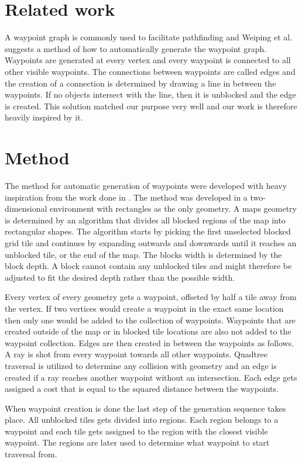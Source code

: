 \documentclass[a4paper]{article}
\begin{document}
\section{Related work}
A waypoint graph is commonly used to facilitate pathfinding and Weiping et al. \cite{dynaPF15} suggests a method of how to automatically generate the waypoint graph. Waypoints are generated at every vertex and every waypoint is connected to all other visible waypoints. The connections between waypoints are called edges \cite{dynaPF15} and the creation of a connection is determined by drawing a line in between the waypoints. If no objects intersect with the line, then it is unblocked and the edge is created. This solution matched our purpose very well and our work is therefore heavily inspired by it.

\section{Method}
The method for automatic generation of waypoints were developed with heavy inspiration from the work done in \cite{dynaPF15}. The method was developed in a two-dimensional environment with rectangles as the only geometry. A maps geometry is determined by an algorithm that divides all blocked regions of the map into rectangular shapes. The algorithm starts by picking the first unselected blocked grid tile and continues by expanding outwards and downwards until it reaches an unblocked tile, or the end of the map. The blocks width is determined by the block depth. A block cannot contain any unblocked tiles and might therefore be adjusted to fit the desired depth rather than the possible width.

Every vertex of every geometry gets a waypoint, offseted by half a tile away from the vertex. If two vertices would create a waypoint in the exact same location then only one would be added to the collection of waypoints. Waypoints that are created outside of the map or in blocked tile locations are also not added to the waypoint collection. Edges are then created in between the waypoints as follows. A ray is shot from every waypoint towards all other waypoints. Quadtree traversal is utilized to determine any collision with geometry and an edge is created if a ray reaches another waypoint without an intersection. Each edge gets assigned a cost that is equal to the squared distance between the waypoints.
	
When waypoint creation is done the last step of the generation sequence takes place. All unblocked tiles gets divided into regions. Each region belongs to a waypoint and each tile gets assigned to the region with the closest visible waypoint. The regions are later used to determine what waypoint to start traversal from.
	
\end{document}
